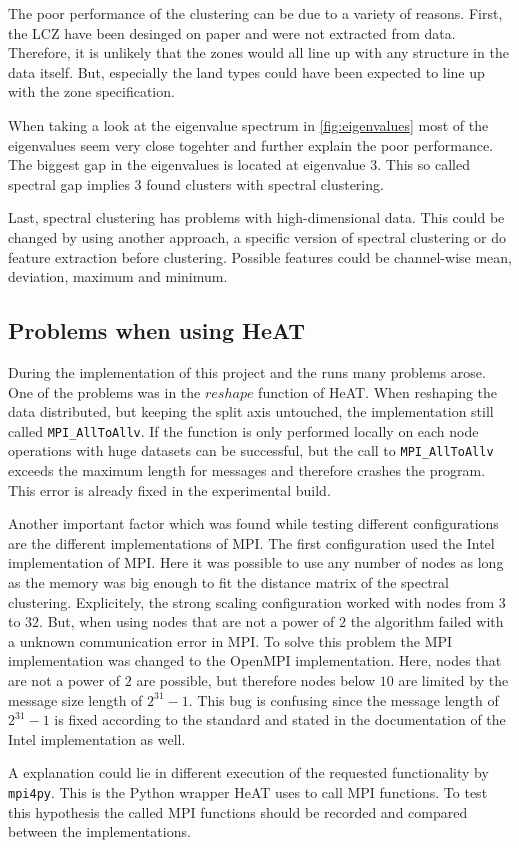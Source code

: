 The poor performance of the clustering can be due to a variety of reasons.
First, the \gls{LCZ} have been desinged on paper and were not extracted from data. Therefore, it is unlikely that
the zones would all line up with any structure in the data itself.
But, especially the land types could have been expected to line up with the zone specification.

When taking a look at the eigenvalue spectrum in \cref{fig:eigenvalues} most of the eigenvalues seem very close togehter and
further explain the poor performance. The biggest gap in the eigenvalues is located at eigenvalue 3. This so called spectral gap
implies 3 found clusters with spectral clustering.

Last, spectral clustering has problems with high-dimensional data. This could be changed by using another approach, a specific version of spectral clustering
or do feature extraction before clustering. Possible features could be channel-wise mean, deviation, maximum and minimum.

\subsection{Problems when using HeAT}
\label{subsec:problems_when_using_heat}
During the implementation of this project and the runs many problems arose.
One of the problems was in the \(reshape\) function of \gls{HeAT}.
When reshaping the data distributed, but keeping the split axis untouched, the implementation still called \lstinline{MPI_AllToAllv}.
If the function is only performed locally on each node operations with huge datasets can be successful, but the call to \lstinline{MPI_AllToAllv} exceeds the maximum length
for messages and therefore crashes the program.
This error is already fixed in the experimental build.

Another important factor which was found while testing different configurations are the different implementations of \gls{MPI}.
The first configuration used the Intel implementation of \gls{MPI}. Here it was possible to use any number of nodes as long as
the memory was big enough to fit the distance matrix of the spectral clustering. Explicitely, the strong scaling configuration worked
with nodes from \(3\) to \(32\). But, when using nodes that are not a power of \(2\) the algorithm failed with a unknown communication error in \gls{MPI}.
To solve this problem the \gls{MPI} implementation was changed to the OpenMPI implementation.
Here, nodes that are not a power of \(2\) are possible, but therefore nodes below \(10\) are limited by the message size length of \(2^{31} - 1\).
This bug is confusing since the message length of \(2^{31} - 1\) is fixed according to the standard and stated in the documentation of the Intel implementation as well.

A explanation could lie in different execution of the requested functionality by \lstinline{mpi4py}. This is the Python wrapper \gls{HeAT} uses to call
\gls{MPI} functions. To test this hypothesis the called \gls{MPI} functions should be recorded and compared between the implementations.
